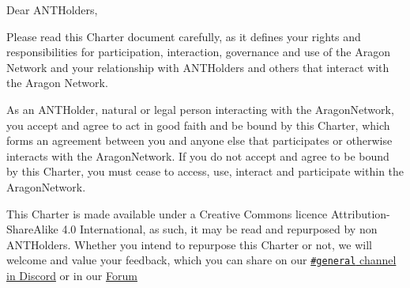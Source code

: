 
\label{chap:Introduction}

Dear \glspl{ANTHolder},

Please read this Charter document carefully, as it defines your rights and responsibilities for participation, interaction, governance and use of the Aragon Network and your relationship with \glspl{ANTHolder} and others that interact with the Aragon Network.

As an \gls{ANTHolder}, natural or legal person interacting with the \gls{AragonNetwork}, you accept and agree to act in good faith and be bound by this Charter, which forms an agreement between you and anyone else that participates or otherwise interacts with the \gls{AragonNetwork}. 
If you do not accept and agree to be bound by this Charter, you must cease to access, use, interact and participate within the \gls{AragonNetwork}.

This Charter is made available under a Creative Commons licence Attribution-Share\-Alike 4.0 International, as such, it may be read and repurposed by non \glspl{ANTHolder}. Whether you intend to repurpose this Charter or not, we will welcome and value your feedback, which you can share on our \href{https://discord.com/invite/eqQJkdp}{\texttt{\#general} channel in Discord} or in our \href{https://forum.aragon.org/}{Forum} 


